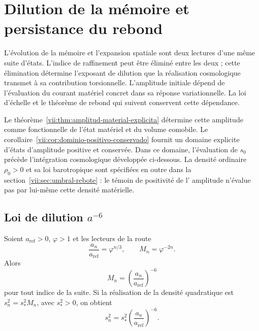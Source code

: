 
\section{Dilution de la mémoire et persistance du rebond}
\label{vii:sec:dilucion-rebote}

L'évolution de la mémoire et l'expansion spatiale sont deux lectures d'une même suite d'états. L'indice de raffinement peut être éliminé entre les deux ; cette élimination détermine l'exposant de dilution que la réalisation cosmologique transmet à sa contribution torsionnelle. L'amplitude initiale dépend de l'évaluation du courant matériel concret dans sa réponse variationnelle. La loi d'échelle et le théorème de rebond qui suivent conservent cette dépendance.

Le théorème~\ref{vii:thm:amplitud-material-explicita} détermine cette
amplitude comme fonctionnelle de l'état matériel et du volume comobile.
Le corollaire~\ref{vii:cor:dominio-positivo-conservado} fournit
un domaine explicite d'états d'amplitude positive et conservée.
Dans ce domaine, l'évaluation de \(s_0\) précède l'intégration
cosmologique développée ci-dessous. La densité ordinaire
\(\rho_0>0\) et sa loi barotropique sont spécifiées en outre dans la
section~\ref{vii:sec:umbral-rebote} : le témoin de positivité de l'
amplitude n'évalue pas par lui-même cette densité matérielle.

\subsection{Loi de dilution \(a^{-6}\)}
\label{vii:sec:dilucion}

\begin{proposition}
\label{vii:prop:dilucion}
Soient \(a_{\mathrm{ref}}>0\), \(\varphi>1\) et les lecteurs de la route
\[
 \frac{a_n}{a_{\mathrm{ref}}}=\varphi^{n/3},\qquad
 M_n=\varphi^{-2n}.
\]
Alors
\[
 M_n=\left(\frac{a_n}{a_{\mathrm{ref}}}\right)^{-6}
\]
pour tout indice de la suite. Si la réalisation de la densité
quadratique est \(s_n^2=s_*^2M_n\), avec \(s_*^2>0\), on obtient
\[
 s_n^2=s_*^2\left(\frac{a_n}{a_{\mathrm{ref}}}\right)^{-6}.
\]
\end{proposition}


